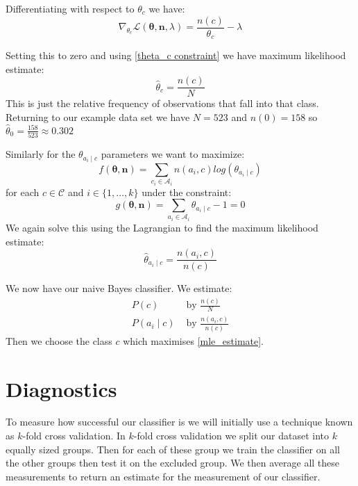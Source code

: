 Differentiating with respect to $\theta_c$ we have:
\begin{equation}
	\nabla_{\theta_c} \mathcal{L}(\mathbf{\theta}, \mathbf{n}, \lambda) = \frac{n(c)}{\theta_c} - \lambda
\end{equation}

Setting this to zero and using \ref{theta_c constraint} we have maximum likelihood estimate:
\begin{equation}
	\hat\theta_c = \frac{n(c)}{N}
\end{equation}
This is just the relative frequency of observations that fall into that class.
Returning to our example data set we have $N=523$ and $n(0)=158$ so $\hat\theta_0 = \frac{158}{523} \approx 0.302$

Similarly for the $\theta_{a_i \mid c}$ parameters we want to maximize:
\begin{equation}
	f(\mathbf{\theta}, \mathbf{n}) = \sum_{c_i \in \mathcal{A}_i} n(a_i, c) log(\theta_{a_i \mid c})
\end{equation}
for each $c \in \mathcal{C}$ and $i \in \{1,\dots,k\}$ under the constraint:
\begin{equation}
	g(\mathbf{\theta}, \mathbf{n}) = \sum_{a_i \in \mathcal{A}_i}  \theta_{a_i \mid c} - 1 = 0
\end{equation}
We again solve this using the Lagrangian to find the maximum likelihood estimate:
\begin{equation}
	\hat\theta_{a_i \mid c} = \frac{n(a_i, c)}{n(c)}
\end{equation}

We now have our naive Bayes classifier.
We estimate:
\begin{align}
	P(c) & \text{ by } \frac{n(c)}{N} \\
	P(a_i \mid c) & \text{ by } \frac{n(a_i, c)}{n(c)}
\end{align}
Then we choose the class $c$ which maximises \cref{mle_estimate}.

\section{Diagnostics}

To measure how successful our classifier is we will initially use a technique known as $k$-fold cross validation.
In $k$-fold cross validation we split our dataset into $k$ equally sized groups.
Then for each of these group we train the classifier on all the other groups then test it on the excluded group.
We then average all these measurements to return an estimate for the measurement of our classifier.

